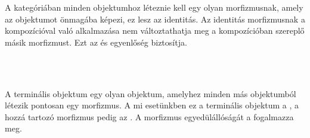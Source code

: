 A kategóriában minden objektumhoz léteznie kell egy olyan morfizmusnak, amely az objektumot önmagába képezi, ez lesz az identitás. Az identitás morfizmusnak a kompozícióval való alkalmazása nem változtathatja meg a kompozícióban szereplő másik morfizmust. Ezt az  és  egyenlőség biztosítja.
\begin{code}%
%
\>[6]%
\>[10]\AgdaSymbol{:}\AgdaSpace{}%
\AgdaSymbol{\}}\AgdaSpace{}%
\AgdaSpace{}%
\AgdaSpace{}%
\AgdaSpace{}%
\<%
\\
%
\>[6]\AgdaSpace{}%
\AgdaSymbol{:}\AgdaSpace{}%
\AgdaSpace{}%
\AgdaSymbol{\}\{}\AgdaSpace{}%
\AgdaSymbol{:}\AgdaSpace{}%
\AgdaSpace{}%
\AgdaSpace{}%
\AgdaSymbol{\}}\AgdaSpace{}%
\AgdaSpace{}%
\AgdaSpace{}%
\AgdaSpace{}%
\AgdaSpace{}%
\AgdaSpace{}%
\<%
\\
%
\>[6]\AgdaSpace{}%
\AgdaSymbol{:}\AgdaSpace{}%
\AgdaSpace{}%
\AgdaSymbol{\}\{}\AgdaSpace{}%
\AgdaSymbol{:}\AgdaSpace{}%
\AgdaSpace{}%
\AgdaSpace{}%
\AgdaSymbol{\}}\AgdaSpace{}%
\AgdaSpace{}%
\AgdaSpace{}%
\AgdaSpace{}%
\AgdaSpace{}%
\AgdaSpace{}%
\<%
\end{code}
A terminális objektum egy olyan objektum, amelyhez minden más objektumból létezik pontosan egy morfizmus. A mi esetünkben ez a terminális objektum a , a hozzá tartozó morfizmus pedig az . A morfizmus egyedülállóságát a  fogalmazza meg.
\begin{code}%
%
\>[6]%
\>[10]\AgdaSymbol{:}\AgdaSpace{}%
\<%
\\
%
\>[6]%
\>[10]\AgdaSymbol{:}\AgdaSpace{}%
\AgdaSymbol{\}}\AgdaSpace{}%
\AgdaSpace{}%
\AgdaSpace{}%
\AgdaSpace{}%
\<%
\\
%
\>[6]%
\>[10]\AgdaSymbol{:}\AgdaSpace{}%
\AgdaSymbol{\}\{}\AgdaSpace{}%
\AgdaSymbol{:}\AgdaSpace{}%
\AgdaSpace{}%
\AgdaSpace{}%
\AgdaSymbol{\}}\AgdaSpace{}%
\AgdaSpace{}%
\AgdaSpace{}%
\AgdaSpace{}%
\<%
\end{code}

